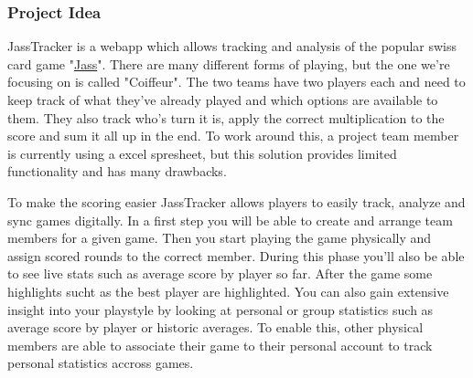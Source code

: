 


\subsubsection*{Project Idea}

JassTracker is a webapp which allows tracking and analysis of the popular swiss card game "\href{https://de.wikipedia.org/wiki/Jass}{Jass}".
There are many different forms of playing, but the one we're focusing on is called "Coiffeur".
The two teams have two players each and need to keep track of what they've already played and which options are available to them.
They also track who's turn it is, apply the correct multiplication to the score and sum it all up in the end.
To work around this, a project team member is currently using a excel spresheet, but this solution provides limited functionality and has many drawbacks.

To make the scoring easier JassTracker allows players to easily track, analyze and sync games digitally. In a first step you will be able to create and arrange team members for a given game.
Then you start playing the game physically and assign scored rounds to the correct member. During this phase you'll also be able to see live stats such as average score by player so far. After the game some highlights sucht as the best player are highlighted. You can also gain extensive insight into your playstyle by looking at personal or group statistics such as average score by player or historic averages. To enable this, other physical members are able to associate their game to their personal account to track personal statistics accross games.


